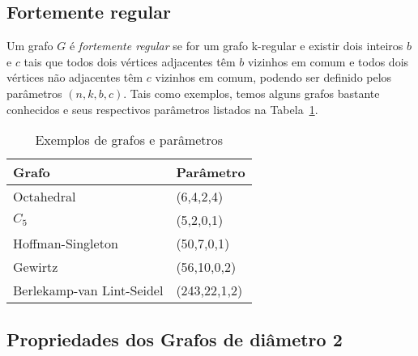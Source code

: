 \subsection{Fortemente regular}
\label{sec-fr}

Um grafo $G$ é \textit{fortemente regular} se for um grafo k-regular 
e existir dois inteiros $b$ e $c$ tais que todos dois vértices adjacentes têm $b$ vizinhos em comum e todos dois vértices não adjacentes têm $c$ vizinhos em comum, podendo ser definido pelos parâmetros $(n,k,b,c)$. Tais como exemplos, temos alguns grafos bastante conhecidos e seus respectivos parâmetros listados na Tabela~\ref{tab-exemplos-grafos-fr}.

\begin{table}[h]
\centering
\caption{Exemplos de grafos e parâmetros}
\label{tab-exemplos-grafos-fr}
\begin{tabular}{|l|l|}
\hline
\textbf{Grafo}            & \textbf{Parâmetro} \\ \hline
Octahedral                & (6,4,2,4)          \\ \hline
$C_5$                     & (5,2,0,1)          \\ \hline
Hoffman-Singleton         & (50,7,0,1)         \\ \hline
Gewirtz                   & (56,10,0,2)        \\ \hline
Berlekamp-van Lint-Seidel & (243,22,1,2)       \\ \hline
\end{tabular}
\end{table}




\subsection{Propriedades dos Grafos de diâmetro 2}

